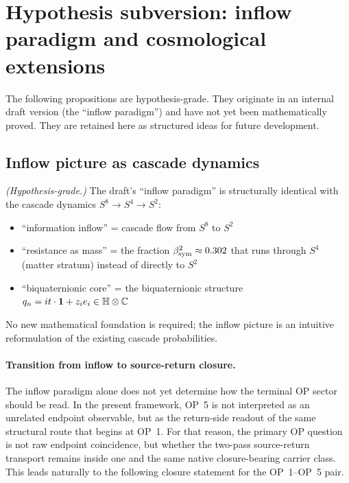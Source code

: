 \section{Hypothesis subversion: inflow paradigm and cosmological extensions}
\label{sec:inflow-hypotheses}

\begin{remark}
The following propositions are hypothesis-grade. They originate in an
internal draft version (the ``inflow paradigm'') and have not yet been
mathematically proved. They are retained here as structured ideas for
future development.
\end{remark}

\subsection{Inflow picture as cascade dynamics}

\begin{proposition}
\label{prop:inflow-cascade}
\emph{(Hypothesis-grade.)}
The draft's ``inflow paradigm'' is structurally identical with the
cascade dynamics $S^8\to S^4\to S^2$:
\begin{itemize}
 \item ``information inflow'' = cascade flow from $S^8$ to $S^2$
 \item ``resistance as mass'' = the fraction $\beta_{\mathrm{sym}}^2 \approx 0.302$
 that runs through $S^4$ (matter stratum) instead of directly to $S^2$
 \item ``biquaternionic core'' = the biquaternionic structure
 $q_n = it\cdot\mathbf{1} + z_i e_i \in \mathbb{H}\otimes\mathbb{C}$
\end{itemize}

No new mathematical foundation is required; the inflow picture is an
intuitive reformulation of the existing cascade probabilities.
\end{proposition}

\paragraph{Transition from inflow to source-return closure.}
The inflow paradigm alone does not yet determine how the terminal OP sector should be read. In the present framework, OP~5 is not interpreted as an unrelated endpoint observable, but as the return-side readout of the same structural route that begins at OP~1. For that reason, the primary OP question is not raw endpoint coincidence, but whether the two-pass source-return transport remains inside one and the same native closure-bearing carrier class. This leads naturally to the following closure statement for the OP~1--OP~5 pair.


